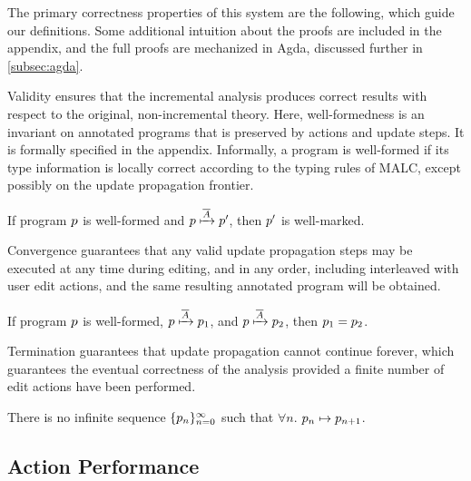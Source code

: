 The primary correctness properties of this system are the following, which guide our definitions. Some additional intuition about the proofs are included in the appendix, and the full proofs are mechanized in Agda, discussed further in \autoref{subsec:agda}.

Validity ensures that the incremental analysis produces correct results with respect to the original, non-incremental theory. Here, well-formedness is an invariant on annotated programs that is preserved by actions and update steps. It is formally specified in the appendix. Informally, a program is well-formed if its type information is locally correct according to the typing rules of MALC, except possibly on the update propagation frontier. 

\begin{theorem}[Validity]
    If program $p$ is well-formed and $p\xmapsto{\overline{\ensuremath{A}}}p'$, then $p'$ is well-marked. 
\end{theorem}

Convergence guarantees that any valid update propagation steps may be executed at any time during editing, and in any order, including interleaved with user edit actions, and the same resulting annotated program will be obtained. 
\begin{theorem}[Convergence]
    If program $p$ is well-formed, $p\xmapsto{\overline{\ensuremath{A}}}p_1$, and $p\xmapsto{\overline{\ensuremath{A}}}p_2$, then $p_1=p_2$. 
\end{theorem}

Termination guarantees that update propagation cannot continue forever, which guarantees the eventual correctness of the analysis provided a finite number of edit actions have been performed. %
\begin{theorem}[Termination]
    There is no infinite sequence $\{p_n\}_{n= 0}^\infty$ such that $\forall n$. $p_n\mapsto p_{n+1}$. 
\end{theorem}



\subsection{Action Performance}
\label{subsec:actions}

